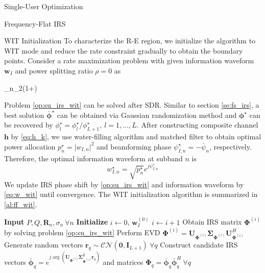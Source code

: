\documentclass{IEEEtran}
\begin{document}
\begin{section}{Single-User Optimization}
\begin{subsection}{Frequency-Flat IRS}
		\begin{subsubsection}{WIT Initialization}
			To characterize the R-E region, we initialize the algorithm to WIT mode and reduce the rate constraint gradually to obtain the boundary points. Consider a rate maximization problem with given information waveform $\boldsymbol{w}_I$ and power splitting ratio $\rho = 0$ as
			\begin{maxi!}
				{\boldsymbol{\Phi}}{\sum_{n}{\log_2\left(1+\right)}}{\label{op:su_irs_wit}}{}
			\end{maxi!}
			Problem \ref{op:su_irs_wit} can be solved after SDR. Similar to section \ref{se:fs_irs}, a best solution $\bar{\boldsymbol{\phi}}^\star$ can be obtained via Gaussian randomization method and $\boldsymbol{\phi}^\star$ can be recovered by $\phi_l^\star=\phi_l^\star/\phi_{L+1}^\star, \ l=1,\dots,L$. After constructing composite channel $\boldsymbol{h}$ by \ref{eq:h_k}, we use water-filling algorithm and matched filter to obtain optimal power allocation $p_n^\star=\lvert w_{I,n} \rvert^2$ and beamforming phase $\psi_{I,n}^\star=-\bar{\psi}_n$, respectively. Therefore, the optimal information waveform at subband $n$ is
			\begin{equation}\label{eq:w_wit}
				w_{I,n}^\star=\sqrt{p_n^\star}e^{j \psi_{I,n}^\star}
			\end{equation}
			We update IRS phase shift by \ref{op:su_irs_wit} and information waveform by \ref{eq:w_wit} until convergence. The WIT initialization algorithm is summarized in \ref{al:ff_wit}.
			\begin{algorithm}
				\caption{FF-IRS: WIT Initialization}
				\label{al:ff_wit}
				\begin{algorithmic}[1]
					\State \textbf{Input} $P, Q, \boldsymbol{R}_n, \sigma_n \ \forall n$
					\State \textbf{Initialize} $i \leftarrow 0$, $\boldsymbol{w}_I^{(0)}$
					\Repeat
					\State $i \leftarrow i + 1$
					\State Obtain IRS matrix $\boldsymbol{\Phi}^{(i)}$ by solving problem \ref{op:su_irs_wit}
					\State Perform EVD $\boldsymbol{\Phi}^{(i)}=\boldsymbol{U}_{\boldsymbol{\Phi}^{(i)}}\boldsymbol{\Sigma}_{\boldsymbol{\Phi}^{(i)}}\boldsymbol{U}_{\boldsymbol{\Phi}^{(i)}}^H$
					\State Generate random vectors $\boldsymbol{r}_q \sim \mathcal{CN}(\boldsymbol{0},\boldsymbol{I}_{L+1}) \ \forall q$
					\State Construct candidate IRS vectors $\bar{\boldsymbol{\phi}}_q=e^{j\arg\left(\boldsymbol{U}_{\boldsymbol{\Phi}^{(i)}}\boldsymbol{\Sigma}_{\boldsymbol{\Phi}^{(i)}}^{\frac{1}{2}}\boldsymbol{r}_q\right)}$ and matrices $\boldsymbol{\Phi}_q=\bar{\boldsymbol{\phi}}_q\bar{\boldsymbol{\phi}}_q^H  \ \forall q$

\end{algorithmic}
\end{algorithm}
\end{subsubsection}
\end{subsection}
\end{section}
\end{document}

